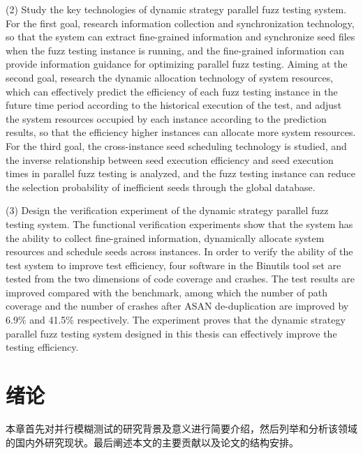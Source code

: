\documentclass[master]{thesis-uestc}
\begin{document}
\begin{englishabstract}
(2) Study the key technologies of dynamic strategy parallel fuzz testing system. For the first goal, research information collection and synchronization technology, so that the system can extract fine-grained information and synchronize seed files when the fuzz testing instance is running, and the fine-grained information can provide information guidance for optimizing parallel fuzz testing. Aiming at the second goal, research the dynamic allocation technology of system resources, which can effectively predict the efficiency of each fuzz testing instance in the future time period according to the historical execution of the test, and adjust the system resources occupied by each instance according to the prediction results, so that the efficiency higher instances can allocate more system resources. For the third goal, the cross-instance seed scheduling technology is studied, and the inverse relationship between seed execution efficiency and seed execution times in parallel fuzz testing is analyzed, and the fuzz testing instance can reduce the selection probability of inefficient seeds through the global database.

(3) Design the verification experiment of the dynamic strategy parallel fuzz testing system. The functional verification experiments show that the system has the ability to collect fine-grained information, dynamically allocate system resources and schedule seeds across instances. In order to verify the ability of the test system to improve test efficiency, four software in the Binutils tool set are tested from the two dimensions of code coverage and crashes. The test results are improved compared with the benchmark, among which the number of path coverage and the number of crashes after ASAN de-duplication are improved by 6.9\% and 41.5\% respectively. The experiment proves that the dynamic strategy parallel fuzz testing system designed in this thesis can effectively improve the testing efficiency.

\end{englishabstract}

\thesistableofcontents %

\chapter{绪\hspace{6pt}论}
本章首先对并行模糊测试的研究背景及意义进行简要介绍，然后列举和分析该领域的国内外研究现状。最后阐述本文的主要贡献以及论文的结构安排。
\end{document}
